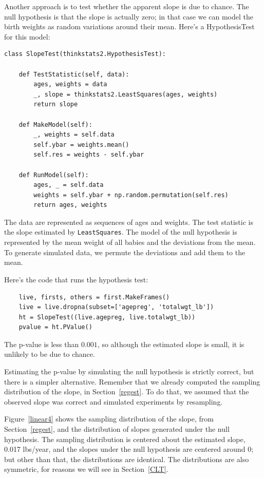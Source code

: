 \documentclass[12pt]{book}
\theoremstyle{exercise}
\begin{document}
Another approach is to test whether the apparent slope is due to chance.
The null hypothesis is that the slope is actually zero; in that case
we can model the birth weights as random variations around their mean.
Here's a HypothesisTest for this model:%
%

\begin{verbatim}
class SlopeTest(thinkstats2.HypothesisTest):

    def TestStatistic(self, data):
        ages, weights = data
        _, slope = thinkstats2.LeastSquares(ages, weights)
        return slope

    def MakeModel(self):
        _, weights = self.data
        self.ybar = weights.mean()
        self.res = weights - self.ybar

    def RunModel(self):
        ages, _ = self.data
        weights = self.ybar + np.random.permutation(self.res)
        return ages, weights
\end{verbatim}

The data are represented as sequences of ages and weights.  The
test statistic is the slope estimated by {\tt LeastSquares}.
The model of the null hypothesis is represented by the mean weight
of all babies and the deviations from the mean.  To
generate simulated data, we permute the deviations and add them to
the mean.%
%
%

Here's the code that runs the hypothesis test:

\begin{verbatim}
    live, firsts, others = first.MakeFrames()
    live = live.dropna(subset=['agepreg', 'totalwgt_lb'])
    ht = SlopeTest((live.agepreg, live.totalwgt_lb))
    pvalue = ht.PValue()
\end{verbatim}

The p-value is less than $0.001$, so although the estimated
slope is small, it is unlikely to be due to chance.%
%
%

Estimating the p-value by simulating the null hypothesis is strictly
correct, but there is a simpler alternative.  Remember that we already
computed the sampling distribution of the slope, in
Section~\ref{regest}.  To do that, we assumed that the observed slope
was correct and simulated experiments by resampling.%

Figure~\ref{linear4} shows the sampling distribution of the
slope, from Section~\ref{regest}, and the distribution of slopes
generated under the null hypothesis.  The sampling distribution
is centered about the estimated slope, 0.017 lbs/year, and the slopes
under the null hypothesis are centered around 0; but other than
that, the distributions are identical.  The distributions are
also symmetric, for reasons we will see in Section~\ref{CLT}.%
%
\end{document}
